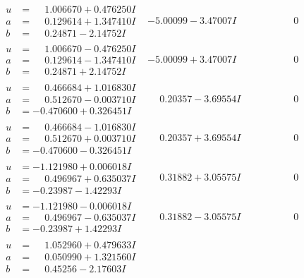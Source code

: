 \documentclass[1p]{elsarticle_modified}
\theoremstyle{definition}
\begin{document}
$$\begin{array}{c|c|c}
\begin{aligned}
u &= \phantom{-}1.006670 + 0.476250 I \\
a &= \phantom{-}0.129614 + 1.347410 I \\
b &= \phantom{-}0.24871 - 2.14752 I\end{aligned}
 & -5.00099 - 3.47007 I & \phantom{-0.000000 } 0 \\ \hline\begin{aligned}
u &= \phantom{-}1.006670 - 0.476250 I \\
a &= \phantom{-}0.129614 - 1.347410 I \\
b &= \phantom{-}0.24871 + 2.14752 I\end{aligned}
 & -5.00099 + 3.47007 I & \phantom{-0.000000 } 0 \\ \hline\begin{aligned}
u &= \phantom{-}0.466684 + 1.016830 I \\
a &= \phantom{-}0.512670 - 0.003710 I \\
b &= -0.470600 + 0.326451 I\end{aligned}
 & \phantom{-}0.20357 - 3.69554 I & \phantom{-0.000000 } 0 \\ \hline\begin{aligned}
u &= \phantom{-}0.466684 - 1.016830 I \\
a &= \phantom{-}0.512670 + 0.003710 I \\
b &= -0.470600 - 0.326451 I\end{aligned}
 & \phantom{-}0.20357 + 3.69554 I & \phantom{-0.000000 } 0 \\ \hline\begin{aligned}
u &= -1.121980 + 0.006018 I \\
a &= \phantom{-}0.496967 + 0.635037 I \\
b &= -0.23987 - 1.42293 I\end{aligned}
 & \phantom{-}0.31882 + 3.05575 I & \phantom{-0.000000 } 0 \\ \hline\begin{aligned}
u &= -1.121980 - 0.006018 I \\
a &= \phantom{-}0.496967 - 0.635037 I \\
b &= -0.23987 + 1.42293 I\end{aligned}
 & \phantom{-}0.31882 - 3.05575 I & \phantom{-0.000000 } 0 \\ \hline\begin{aligned}
u &= \phantom{-}1.052960 + 0.479633 I \\
a &= \phantom{-}0.050990 + 1.321560 I \\
b &= \phantom{-}0.45256 - 2.17603 I\end{aligned}

\end{array}$$
\end{document}
